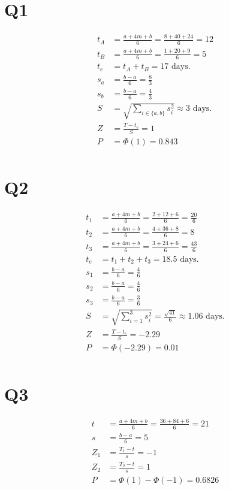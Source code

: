 \documentclass[11pt]{article}
\begin{document}
\section{Q1}

\begin{align*}
t_A &= \frac{a + 4m + b}{6}  = \frac{8 + 40 + 24}{6} = 12 \\
t_B &= \frac{a + 4m + b}{6} = \frac{1 + 20 + 9}{6} = 5 \\
t_e &= t_A + t_B = 17 \text{ days.} \\
s_a &= \frac{b-a}{6} = \frac{8}{3} \\
s_b &= \frac{b-a}{6} = \frac{4}{3} \\
S &= \sqrt{\sum_{i \in \{a, b\}}s_i^2} \approx 3 \text{ days.} \\
Z &= \frac{T-t_e}{S} = 1 \\
P & = \Phi(1) = 0.843\\
\end{align*}

\section{Q2}

\begin{align*}
t_1 &= \frac{a + 4m + b}{6}  = \frac{2 + 12 + 6}{6} = \frac{20}{6} \\
t_2 &= \frac{a + 4m + b}{6} = \frac{4 + 36 +8}{6} = 8 \\
t_3 &= \frac{a + 4m + b}{6} = \frac{3 + 24 + 6}{6} = \frac{43}{6} \\
t_e &= t_1 + t_2 + t_3 =  18.5 \text{ days.} \\
s_1 &= \frac{b-a}{6} = \frac{4}{6} \\
s_2 &= \frac{b-a}{6} = \frac{4}{6} \\
s_3 &= \frac{b-a}{6} = \frac{3}{6} \\
S &= \sqrt{\sum_{i = 1}^{3} s_i^2} = \frac{\sqrt{41}}{6} \approx 1.06 \text{ days.} \\
Z &= \frac{T-t_e}{S} = -2.29 \\
P & = \Phi(-2.29) = 0.01\\
\end{align*}

\section{Q3}
\begin{align*}
t &= \frac{a + 4m + b}{6}  = \frac{36+84+6}{6} = 21 \\
s &= \frac{b-a}{6} = 5 \\
Z_1 &= \frac{T_1 - t}{s} = -1 \\
Z_2 &= \frac{T_2 - t}{s} = 1 \\
P & = \Phi(1) - \Phi(-1) = 0.6826
\end{align*}
\end{document}
